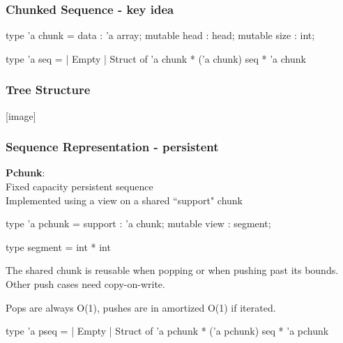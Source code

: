 \begin{frame}[fragile]
\frametitle{Chunked Sequence - key idea}

\begin{caml}
  type 'a chunk = {
    data : 'a array;
    mutable head : head;
    mutable size : int; }
\end{caml}

\begin{caml}
 type 'a seq =
 |  Empty
 | Struct of 'a chunk * ('a chunk) seq * 'a chunk
\end{caml}

\end{frame}


\begin{frame}[fragile]
\frametitle{Tree Structure}
[image]

\end{frame}



\begin{frame}[fragile]
\frametitle{Sequence Representation - persistent}

\textbf{Pchunk}:\\
Fixed capacity persistent sequence\\
Implemented using a view on a shared ``support" chunk

\begin{caml}
  type 'a pchunk = {
    support : 'a chunk;
    mutable view : segment; }
\end{caml}

\begin{caml}
type segment = int * int
\end{caml}

\medskip

The shared chunk is reusable when popping or when pushing past its bounds. Other push cases need copy-on-write.

\medskip

Pops are always O(1), pushes are in amortized O(1) if iterated.

\begin{caml}
 type 'a pseq =
 | Empty
 | Struct of 'a pchunk * ('a pchunk) seq * 'a pchunk
\end{caml}

\end{frame}

